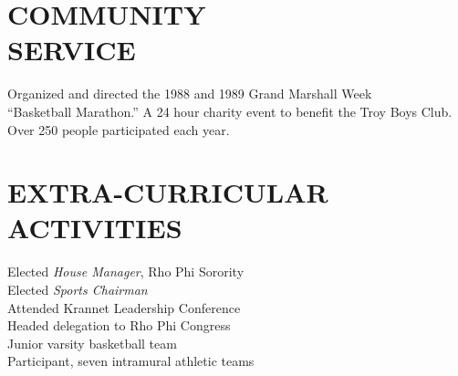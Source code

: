 \documentclass[margin, 10pt]{res} %
\begin{document}
\begin{resume}

\section{COMMUNITY \\ SERVICE}

Organized and directed the 1988 and 1989 Grand Marshall Week \\
``Basketball Marathon.'' A 24 hour charity event to benefit the Troy Boys Club. Over 250 people participated each year. 


\section{EXTRA-CURRICULAR \\ ACTIVITIES} 

Elected {\it House Manager}, Rho Phi Sorority \\
Elected {\it Sports Chairman} \\
Attended Krannet Leadership Conference \\
Headed delegation to Rho Phi Congress \\
Junior varsity basketball team \\
Participant, seven intramural athletic teams 


\end{resume}
\end{document}
